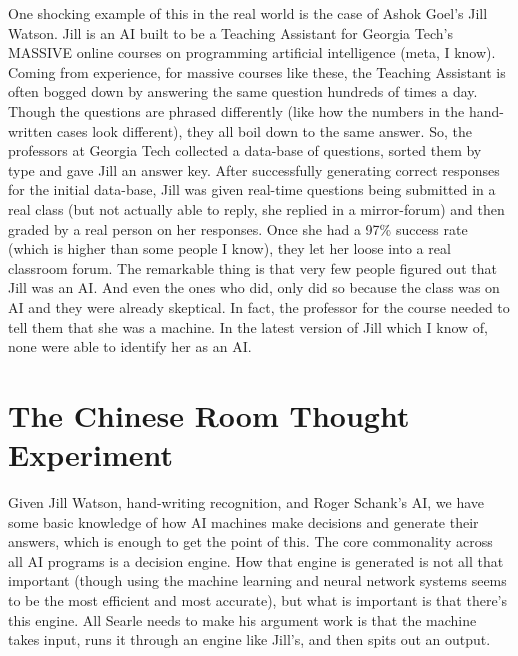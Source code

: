 One shocking example of this in the real world is the case of Ashok Goel's Jill Watson\autocite{JillWatson1}. Jill is an AI built to be a Teaching Assistant for Georgia Tech's MASSIVE online courses on programming artificial intelligence (meta, I know). Coming from experience, for massive courses like these, the Teaching Assistant is often bogged down by answering the same question hundreds of times a day. Though the questions are phrased differently (like how the numbers in the hand-written cases look different), they all boil down to the same answer.  So, the professors at Georgia Tech collected a data-base of questions, sorted them by type and gave Jill an answer key. After successfully generating correct responses for the initial data-base, Jill was given real-time questions being submitted in a real class (but not actually able to reply, she replied in a mirror-forum) and then graded by a real person on her responses. Once she had a 97\% success rate (which is higher than some people I know), they let her loose into a real classroom forum. The remarkable thing is that very few people figured out that Jill was an AI. And even the ones who did, only did so because the class was on AI and they were already skeptical. In fact, the professor for the course needed to tell them that she was a machine. In the latest version of Jill which I know of, none were able to identify her as an AI.

\section{The Chinese Room Thought Experiment}

Given Jill Watson, hand-writing recognition, and Roger Schank's AI, we have some basic knowledge of how AI machines make decisions and generate their answers, which is enough to get the point of this. The core commonality across all AI programs is a decision engine. How that engine is generated is not all that important (though using the machine learning and neural network systems seems to be the most efficient and most accurate), but what is important is that there's this engine. All Searle needs to make his argument work is that the machine takes input, runs it through an engine like Jill's, and then spits out an output. 

